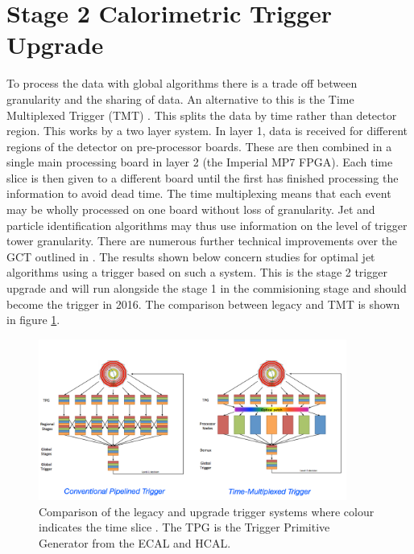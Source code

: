 \section{Stage 2 Calorimetric Trigger Upgrade}
To process the data with global algorithms there is a trade off between granularity and the sharing of data. An alternative to this is the Time Multiplexed Trigger (TMT) \cite{rose}. This splits the data by time rather than detector region. This works by a two layer system. In layer 1, data is received for different regions of the detector on pre-processor boards. These are then combined in a single main processing board in layer 2 (the Imperial MP7 FPGA). Each time slice is then given to a different board until the first has finished processing the information to avoid dead time. The time multiplexing means that each event may be wholly processed on one board without loss of granularity. Jet and particle identification algorithms may thus use information on the level of trigger tower granularity. There are numerous further technical improvements over the GCT outlined in \cite{rose}. The results shown below concern studies for optimal jet algorithms using a trigger based on such a system. This is the stage 2 trigger upgrade and will run alongside the stage 1 in the commisioning stage and should become the trigger in 2016. The comparison between legacy and TMT is shown in figure \ref{tmux}.
\begin{figure}
\centering
    \includegraphics[width=0.9\textwidth]{./Figures/tmux}
  \caption{Comparison of the legacy and upgrade trigger systems where colour indicates the time slice \cite{JBrooke}. The TPG is the Trigger Primitive Generator from the ECAL and HCAL.}
  \label{tmux}
\end{figure}
